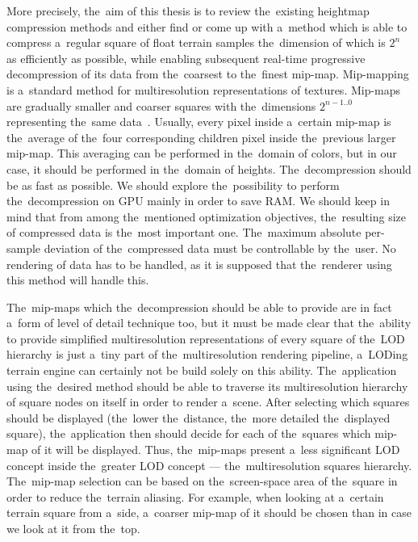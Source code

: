 More precisely, the~aim of this thesis is to review the~existing heightmap compression methods and either find or come up with a~method which is able to compress a~regular square of float terrain samples the~dimension of which is $2^n$ as efficiently as possible, while enabling subsequent real-time progressive decompression of its data from the~coarsest to the~finest mip-map. Mip-mapping is a~standard method for multiresolution representations of textures. Mip-maps are gradually smaller and coarser squares with the~dimensions $2^{n-1 .. 0}$ representing the~same data~\cite{basics}. Usually, every pixel inside a~certain mip-map is the~average of the~four corresponding children pixel inside the~previous larger mip-map. This averaging can be performed in the~domain of colors, but in our case, it should be performed in the~domain of heights. The~decompression should be as fast as possible. We should explore the~possibility to perform the~decompression on GPU mainly in order to save RAM. We should keep in mind that from among the~mentioned optimization objectives, the~resulting size of compressed data is the~most important one. The~maximum absolute per-sample deviation of the~compressed data must be controllable by the~user. No rendering of data has to be handled, as it is supposed that the~renderer using this method will handle this. 

The~mip-maps which the~decompression should be able to provide are in fact a~form of level of detail technique too, but it must be made clear that the~ability to provide simplified multiresolution representations of every square of the~LOD hierarchy is just a~tiny part of the~multiresolution rendering pipeline, a~LODing terrain engine can certainly not be build solely on this ability. The~application using the~desired method should be able to traverse its multiresolution hierarchy of square nodes on itself in order to render a~scene. After selecting which squares should be displayed (the~lower the~distance, the~more detailed the~displayed square), the~application then should decide for each of the~squares which mip-map of it will be displayed. Thus, the~mip-maps present a~less significant LOD concept inside the~greater LOD concept --- the~multiresolution squares hierarchy. The~mip-map selection can be based on the~screen-space area of the~square in order to reduce the~terrain aliasing. For example, when looking at a~certain terrain square from a~side, a~coarser mip-map of it should be chosen than in case we look at it from the~top.

